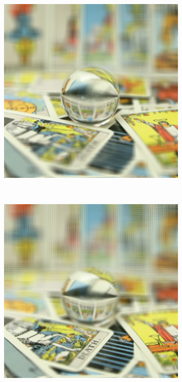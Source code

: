 \documentclass[11pt,a4paper,titlepage]{article}
\begin{document}
\begin{figure}
\begin{subfigure}[t]{0.19\textwidth}
	\end{subfigure}%
	~
	\begin{subfigure}[t]{0.19\textwidth}
		\includegraphics[width=\textwidth]{results/tarot_back_projection/sensorPlaneZ=-3/Back_Projection_layer_3.png} 
	\end{subfigure}%
	~
	\begin{subfigure}[t]{0.19\textwidth}
		\includegraphics[width=\textwidth]{results/tarot_back_projection/sensorPlaneZ=-3/Back_Projection_layer_4.png}

\end{subfigure}
\end{figure}
\end{document}
